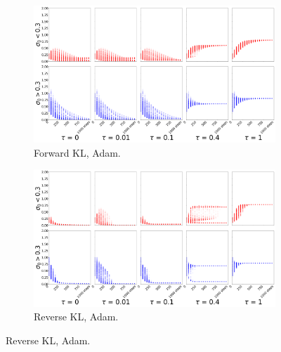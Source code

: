 \documentclass{article}
\begin{document}
\begin{figure}[!ht]
  \centering
  \begin{subfigure}[b]{0.4\linewidth}
    \centering
    \includegraphics[width=1\columnwidth]{figs/bandit/notlearnQ/modes=1/adam/std_forward_optim=adam_modes=1_lr=0.01.png}
    \caption{Forward KL, Adam.}
    \label{fig:bandit-std-forward-adam}
  \end{subfigure}%
  \begin{subfigure}[b]{0.4\linewidth}
    \centering
    \includegraphics[width=1\columnwidth]{figs/bandit/notlearnQ/modes=1/adam/std_reverse_optim=adam_modes=1_lr=0.01.png}
    \caption{Reverse KL, Adam. }
    \label{fig:bandit-std-reverse-adam}
  \end{subfigure}
  

\end{figure}
\end{document}
